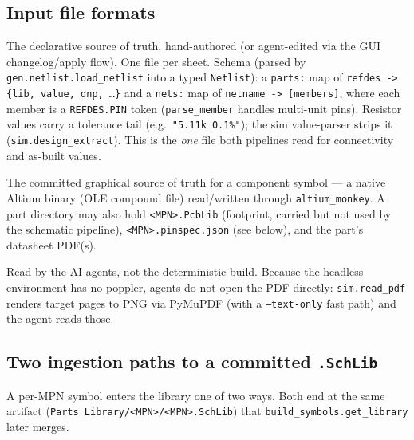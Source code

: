 \documentclass[11pt]{article}
\newcommand{\file}[1]{\texttt{#1}}
\newcommand{\mod}[1]{\texttt{#1}}
\begin{document}
\subsection{Input file formats}
\begin{description}[leftmargin=1.4em]
  \item[Netlist YAML \textnormal{(\file{test1/netlist/<sheet>.yaml})}.] The
    declarative source of truth, hand-authored (or agent-edited via the GUI
    changelog/apply flow). One file per sheet. Schema (parsed by
    \mod{gen.netlist.load\_netlist} into a typed \texttt{Netlist}): a
    \texttt{parts:} map of \texttt{refdes -> \{lib, value, dnp, \dots\}} and a
    \texttt{nets:} map of \texttt{netname -> [members]}, where each member is a
    \texttt{REFDES.PIN} token (\texttt{parse\_member} handles multi-unit pins).
    Resistor values carry a tolerance tail (e.g.\ \texttt{"5.11k 0.1\%"}); the
    sim value-parser strips it (\mod{sim.design\_extract}). This is the \emph{one}
    file both pipelines read for connectivity and as-built values.
  \item[Per-MPN Altium symbol \textnormal{(\file{Parts Library/<MPN>/<MPN>.SchLib})}.]
    The committed graphical source of truth for a component symbol --- a native
    Altium binary (OLE compound file) read/written through \mod{altium\_monkey}.
    A part directory may also hold \file{<MPN>.PcbLib} (footprint, carried but not
    used by the schematic pipeline), \file{<MPN>.pinspec.json} (see below), and
    the part's datasheet PDF(s).
  \item[Datasheet PDF \textnormal{(\file{Parts Library/<MPN>/*.pdf})}.] Read by
    the AI agents, not the deterministic build. Because the headless environment
    has no poppler, agents do not open the PDF directly: \mod{sim.read\_pdf}
    renders target pages to PNG via PyMuPDF (with a \texttt{--text-only} fast
    path) and the agent reads those.
\end{description}

\subsection{Two ingestion paths to a committed \file{.SchLib}}
A per-MPN symbol enters the library one of two ways. Both end at the same
artifact (\file{Parts Library/<MPN>/<MPN>.SchLib}) that
\mod{build\_symbols.get\_library} later merges.
\end{document}
